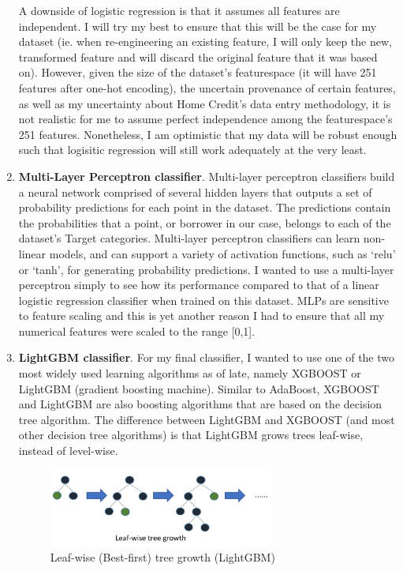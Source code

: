 \documentclass[12pt, letterpaper]{article}
\begin{document}
\begin{enumerate}
  A downside of logistic regression is that it assumes all features are independent. I will try my best to ensure that this will be the case for my dataset (ie. when re-engineering an existing feature, I will only keep the new, transformed feature and will discard the original feature that it was based on). However, given the size of the dataset's featurespace (it will have 251 features after one-hot encoding), the uncertain provenance of certain features, as well as my uncertainty about Home Credit's data entry methodology, it is not realistic for me to assume perfect independence among the featurespace's 251 features. Nonetheless, I am optimistic that my data will be robust enough such that logisitic regression will still work adequately at the very least.
  \item \textbf{Multi-Layer Perceptron classifier}. Multi-layer perceptron classifiers build a neural network comprised of several hidden layers that outputs a set of probability predictions for each point in the dataset. The predictions contain the probabilities that a point, or borrower in our case, belongs to each of the dataset's Target categories. Multi-layer perceptron classifiers can learn non-linear models, and can support a variety of activation functions, such as `relu' or `tanh', for generating probability predictions. I wanted to use a multi-layer perceptron simply to see how its performance compared to that of a linear logistic regression classifier when trained on this dataset. MLPs are sensitive to feature scaling and this is yet another reason I had to ensure that all my numerical features were scaled to the range [0,1].
  \item \textbf{LightGBM classifier}. For my final classifier, I wanted to use one of the two most widely used learning algorithms as of late, namely XGBOOST or LightGBM (gradient boosting machine). Similar to AdaBoost, XGBOOST and LightGBM are also boosting algorithms that are based on the decision tree algorithm. The difference between LightGBM and XGBOOST (and most other decision tree algorithms) is that LightGBM grows trees leaf-wise, instead of level-wise.

  \begin{figure}[ht]
  \includegraphics[width=0.7\textwidth]{leaf-wise}
  \centering
  \caption{Leaf-wise (Best-first) tree growth (LightGBM)\cite{lightgbmdocs}}
  \end{figure}


\end{enumerate}
\end{document}
